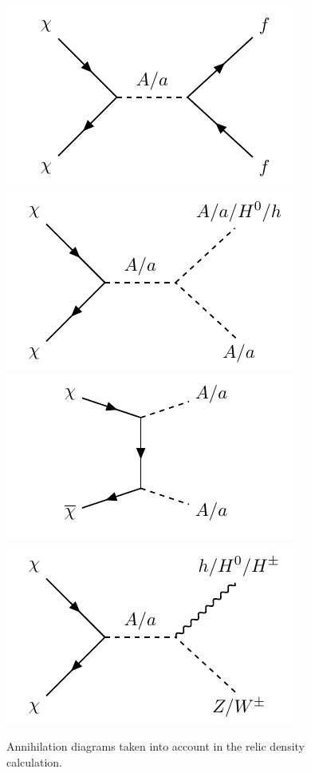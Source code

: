 \begin{figure}[h]
\centering
\includegraphics[]{texinputs/05_relic/figures/feynman/graph_2hdm_relic_s_fermions.pdf}
\includegraphics[]{texinputs/05_relic/figures/feynman/graph_2hdm_relic_s_bosons.pdf}
\includegraphics[]{texinputs/05_relic/figures/feynman/graph_2hdm_relic_ss_bosons.pdf}
\includegraphics[]{texinputs/05_relic/figures/feynman/graph_2hdm_relic_s_vbosons.pdf}

\caption{Annihilation diagrams taken into account in the relic density calculation.}
\label{fig:feyn_annihilation}
\end{figure}

